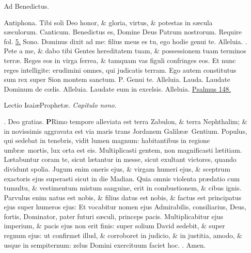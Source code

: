 \documentclass[letter,11pt]{book}
\makeatletter
\DeclareRobustCommand{\Vbar}{\vers@resp{-0.1em}{V}}
\DeclareRobustCommand{\Rbar}{\vers@resp{0pt}{R}}
\newcommand{\vers@resp@sym}{\raisebox{0.2ex}{\rotatebox[origin=c]{-20}{$\m@th\rceil$}}}
\newcommand{\vers@resp}[2]{%
  {\ooalign{\hidewidth\kern#1\vers@resp@sym\hidewidth\cr#2\cr}}%
}%
\def\P{\color{Red} P. \color{black}}
\def\V{\color{Red} \Vbar . \color{black}}
\def\R{\color{Red} \Rbar . \color{black}}
\makeatother
\begin{document}
\begin{multicols*}{2}
\vspace{-.5em} \begin{center} \color{Red} Ad Benedictus. \color{black} \end{center} \vspace{-.5em}
\par \noindent \color{Red} Antiphona. \color{black} Tibi soli Deo honor, \& gloria, virtus, \& potestas in s\ae cula s\ae culorum.
\newline \color{Red} Canticum. \color{black} Benedictus es, Domine Deus Patrum nostrorum. \color{Red} Require fol. \color{black} \hyperlink{benedictus}{5.}
\newline \color{Red} Sono. \color{black} Dominus dixit ad me: filius meus es tu, ego hodie genui te. Alleluia. \V Pete a me, \& dabo tibi Gentes hereditatem tuam, \& possessionem tuam terminos terr\ae . Reges eos in virga ferrea, \& tamquam vas figuli confringes eos. Et nunc reges intelligite: erudimini omnes, qui judicatis terram. Ego autem constitutus sum rex super Sion montem sanctum. \P Genui te. Alleluia.
\newline \color{Red} Lauda. \color{black} Laudate Dominum de c\oe lis. Alleluia.
Laudate eum in excelsis. Alleluia. \color{Red} \hyperlink{ps148}{Psalmus 148.} \color{black}
\vspace{-.5em} \begin{center} {\color{Red} L}ectio Isai\ae Prophet\ae . \itshape Capitulo nono. \color{black} \end{center} \vspace{-.5em}
\par \noindent \R Deo gratias.
\lettrine[lines=2]{\bfseries \color{Red} P}{}Rimo tempore alleviata est terra Zabulon, \& terra Nephthalim; \& in novissimis aggravata est via maris trans Jordanem Galil\ae \ae \ Gentium. Populus, qui sedebat in tenebris, vidit lumen magnum: habitantibus in regione umbr\ae \ mortis, lux orta est eis.
Multiplicasti gentem, non magnificasti l\ae titiam. L\ae tabuntur coram te, sicut l\ae tantur in messe, sicut exultant victores, quando dividunt spolia. Jugum enim oneris ejus, \& virgam humeri ejus, \& sceptrum exactoris ejus superasti sicut in die Madian. Quia omnis violenta pr\ae datio cum tumultu, \& vestimentum mistum sanguine, erit in combustionem, \& cibus ignis.
Parvulus enim natus est nobis, \& filius datus est nobis, \& factus est principatus ejus super humeros ejus: Et vocabitur nomen ejus Admirabilis, consiliarius, Deus, fortis, Dominator, pater futuri s\ae culi, princeps pacis. Multiplicabitur ejus imperium, \& pacis ejus non erit finis: super solium David sedebit, \& super regnum ejus: ut confirmet illud, \& corroboret in judicio, \& in justitia, amodo, \& usque in sempiternum: zelus Domini exercituum faciet hoc. \R Amen.

\end{multicols*}
\end{document}
